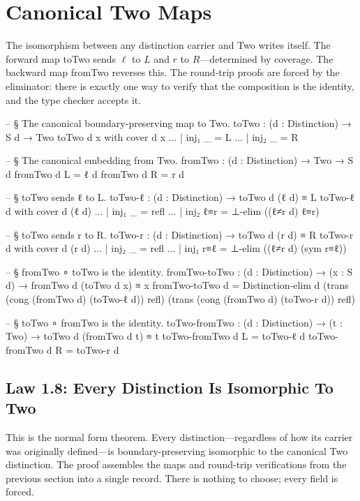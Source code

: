 \documentclass[11pt,a4paper]{book}
\def\texttt#1{#1}%
\begin{document}
\section{Canonical Two Maps}

The isomorphism between any distinction carrier and \texttt{Two} writes itself. The forward map \texttt{toTwo} sends $\ell$ to $L$ and $r$ to $R$—determined by coverage. The backward map \texttt{fromTwo} reverses this. The round-trip proofs are forced by the eliminator: there is exactly one way to verify that the composition is the identity, and the type checker accepts it.

\begin{code}
-- § The canonical boundary-preserving map to Two.
toTwo : (d : Distinction) → S d → Two
toTwo d x with cover d x
... | inj₁ _ = L
... | inj₂ _ = R

-- § The canonical embedding from Two.
fromTwo : (d : Distinction) → Two → S d
fromTwo d L = ℓ d
fromTwo d R = r d

-- § toTwo sends ℓ to L.
toTwo-ℓ : (d : Distinction) → toTwo d (ℓ d) ≡ L
toTwo-ℓ d with cover d (ℓ d)
... | inj₁ _   = refl
... | inj₂ ℓ≡r = ⊥-elim ((ℓ≠r d) ℓ≡r)

-- § toTwo sends r to R.
toTwo-r : (d : Distinction) → toTwo d (r d) ≡ R
toTwo-r d with cover d (r d)
... | inj₂ _   = refl
... | inj₁ r≡ℓ = ⊥-elim ((ℓ≠r d) (sym r≡ℓ))

-- § fromTwo ∘ toTwo is the identity.
fromTwo-toTwo : (d : Distinction) → (x : S d) → fromTwo d (toTwo d x) ≡ x
fromTwo-toTwo d =
  Distinction-elim d
    (trans (cong (fromTwo d) (toTwo-ℓ d)) refl)
    (trans (cong (fromTwo d) (toTwo-r d)) refl)

-- § toTwo ∘ fromTwo is the identity.
toTwo-fromTwo : (d : Distinction) → (t : Two) → toTwo d (fromTwo d t) ≡ t
toTwo-fromTwo d L = toTwo-ℓ d
toTwo-fromTwo d R = toTwo-r d
\end{code}

\subsection{Law 1.8: Every Distinction Is Isomorphic To Two}

This is the normal form theorem. Every distinction—regardless of how its carrier was originally defined—is boundary-preserving isomorphic to the canonical \texttt{Two} distinction. The proof assembles the maps and round-trip verifications from the previous section into a single record. There is nothing to choose; every field is forced.
\end{document}
